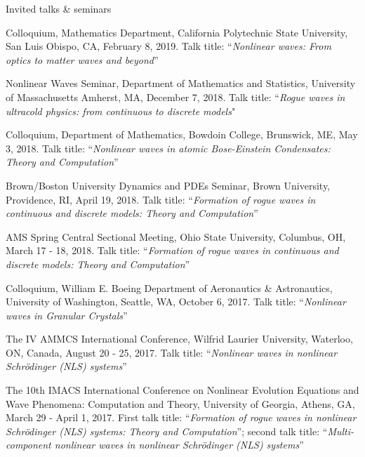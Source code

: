 \documentclass[10pt]{article} %
\begin{document}
\begin{section}{Invited talks \& seminars}
\begin{etaremune}
\item   Colloquium, Mathematics Department, California Polytechnic State University, San Luis Obispo, CA, February 8, 2019.
       Talk title: ``\textit{Nonlinear waves: From optics to matter waves and beyond}''        
        
\item   Nonlinear Waves Seminar, Department of Mathematics and Statistics, University of Massachusetts Amherst, MA, December 7, 2018.
        Talk title: ``\textit{Rogue waves in ultracold physics: from continuous to discrete models}"        
        
\item   Colloquium, Department of Mathematics, Bowdoin College, Brunswick, ME, May 3, 2018.
        Talk title: ``\textit{Nonlinear waves in atomic Bose-Einstein Condensates: Theory and Computation}''
       
\item   Brown/Boston University Dynamics and PDEs Seminar, Brown University, Providence, RI, April 19, 2018.
        Talk title: ``\textit{Formation of rogue waves in continuous and discrete models: Theory and Computation}''

\item   AMS Spring Central Sectional Meeting, Ohio State University, Columbus, OH, March 17 - 18, 2018.
        Talk title: ``\textit{Formation of rogue waves in continuous and discrete models: Theory and Computation}''                
                     
\item   Colloquium, William E. Boeing Department of Aeronautics \& Astronautics, University of Washington, Seattle, WA, October 6, 2017.
        Talk title: ``\textit{Nonlinear waves in Granular Crystals}''
    
\item   The IV AMMCS International Conference, Wilfrid Laurier University, Waterloo, ON, Canada, August 20 - 25, 2017. 
        Talk title: ``\textit{Nonlinear waves in nonlinear Schr\"odinger (NLS) systems}''

\item   The 10th IMACS International Conference on Nonlinear Evolution Equations and Wave Phenomena: Computation and Theory, %
        University of Georgia, Athens, GA, March 29 - April 1, 2017. 
        First talk title: ``\textit{Formation of rogue waves in nonlinear Schr\"odinger (NLS) systems: Theory and Computation}'';      
        second talk title: ``\textit{Multi-component nonlinear waves in nonlinear Schr\"odinger (NLS) systems}''
         

\end{etaremune}
\end{section}
\end{document}
